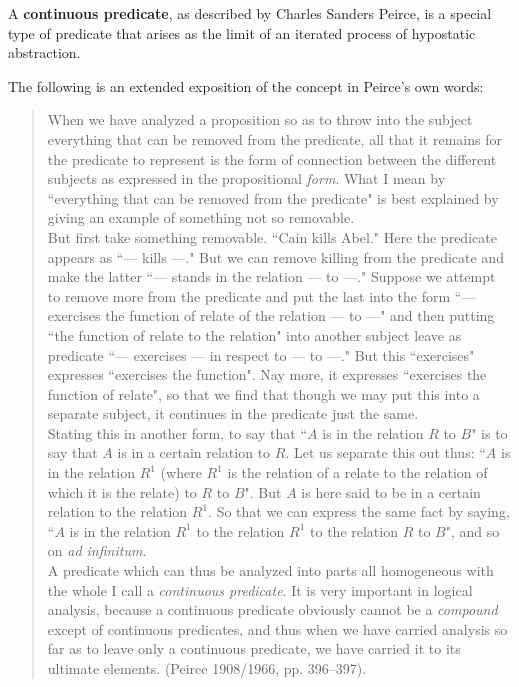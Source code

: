 \documentclass[12pt]{article}
\begin{document}
A \textbf{continuous predicate}, as described by Charles Sanders Peirce, is a special type of  predicate that arises as the limit of an iterated process of hypostatic abstraction.

The following is an extended exposition of the concept in Peirce's own words:

\begin{quote}
When we have analyzed a proposition so as to throw into the subject everything that can be removed from the predicate, all that it remains for the predicate to represent is the form of connection between the different subjects as expressed in the propositional \textit{form}.  What I mean by ``everything that can be removed from the predicate" is best explained by giving an example of something not so removable.\\

But first take something removable.  ``Cain kills Abel."  Here the predicate appears as ``--- kills ---."  But we can remove killing from the predicate and make the latter ``--- stands in the relation --- to ---."  Suppose we attempt to remove more from the predicate and put the last into the form ``--- exercises the function of relate of the relation --- to ---" and then putting ``the function of relate to the relation" into another subject leave as predicate ``--- exercises --- in respect to --- to ---."  But this ``exercises" expresses ``exercises the function".  Nay more, it expresses ``exercises the function of relate", so that we find that though we may put this into a separate subject, it continues in the predicate just the same.\\

Stating this in another form, to say that ``$A$ is in the relation $R$ to $B$" is to say that $A$ is in a certain relation to $R$.  Let us separate this out thus:  ``$A$ is in the relation $R^1$ (where $R^1$ is the relation of a relate to the relation of which it is the relate) to $R$ to $B$".  But $A$ is here said to be in a certain relation to the relation $R^1$.  So that we can express the same fact by saying, ``$A$ is in the relation $R^1$ to the relation $R^1$ to the relation $R$ to $B$", and so on \textit{ad infinitum}.\\

A predicate which can thus be analyzed into parts all homogeneous with the whole I call a \textit{continuous predicate}.  It is very important in logical analysis, because a continuous predicate obviously cannot be a \textit{compound} except of continuous predicates, and thus when we have carried analysis so far as to leave only a continuous predicate, we have carried it to its ultimate elements.  (Peirce 1908/1966, pp. 396--397).
\end{quote}
\end{document}
